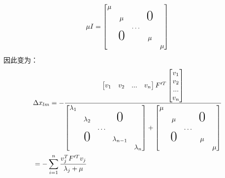 \documentclass[UTF8]{ctexart}
\begin{document}
\begin{equation}
\mu I=
\begin{bmatrix}
    \mu\\
&\mu& & \text{{\huge 0}}\\
&&\dots\\
& \text{{\huge 0}} && \mu\\
&&&& \mu
\end{bmatrix}
\end{equation}
\indent 因此变为：\\
\begin{equation}
\begin{aligned}
&\Delta x_{lm}=-\frac
{
    \begin{bmatrix}
    v_1 & v_2 & ... & v_n
    \end{bmatrix}F'^T
    \begin{bmatrix}
    v_1 \\ v_2 \\ ... \\ v_n
    \end{bmatrix}
}
{
    \begin{bmatrix}
    \lambda_1\\
    &\lambda_2 & & \text{{\huge 0}}\\
    &&\dots\\
    & \text{{\huge 0}} && \lambda_{n-1}\\
    &&&& \lambda_n
    \end{bmatrix}
    +
    \begin{bmatrix}
        \mu\\
    &\mu& & \text{{\huge 0}}\\
    &&\dots\\
    & \text{{\huge 0}} && \mu\\
    &&&& \mu
    \end{bmatrix}
}\\
&=-\sum_{i=1}^n\frac{v_j^TF'^Tv_j}{\lambda _j + \mu}
\end{aligned}
\end{equation}
\end{document}
